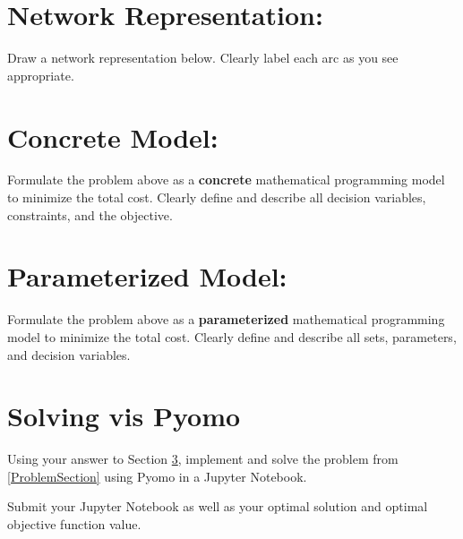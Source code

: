 \documentclass[11pt]{article}
\theoremstyle{definition}
\begin{document}
\section{Network Representation:}

Draw a network representation below. Clearly label each arc as you see appropriate.
\newpage
\section{Concrete Model:}

Formulate the problem above as a \textbf{concrete} mathematical programming model to minimize the total cost. Clearly define and describe all decision variables, constraints, and the objective.

\newpage

\section{Parameterized Model:} \label{Section2}

Formulate the problem above as a \textbf{parameterized} mathematical programming model to minimize the total cost. Clearly define and describe all sets, parameters, and decision variables.


\section{Solving vis Pyomo}

Using your answer to Section \ref{Section2}, implement and solve the problem from \ref{ProblemSection} using Pyomo in a Jupyter Notebook.

Submit your Jupyter Notebook as well as your optimal solution and optimal objective function value.
		
\end{document}

